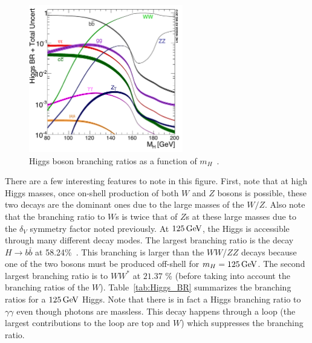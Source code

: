 \begin{figure}[h!]
  \centering
  \captionsetup{justification=centering}
  \includegraphics[width=0.6\textwidth]{figures/Higgs_BR}
  \caption{Higgs boson branching ratios as a function of $m_H$~\cite{LHCXSWG}.}
  \label{fig:branching_ratios}
\end{figure}
%
There are a few interesting features to note in this figure. First, note that at high Higgs masses, once on-shell production of both $W$ and $Z$ bosons is possible, these two decays are the dominant ones due to the large masses of the $W/Z$. Also note that the branching ratio to $W$s is twice that of $Z$s at these large masses due to the $\delta_V$ symmetry factor noted previously. At $125 \GeV$, the Higgs is accessible through many different decay modes. The largest branching ratio is the decay $H\to b\bar{b}$ at 58.24\%~\cite{LHCXSWG}. This branching is larger than the $WW$/$ZZ$ decays because one of the two bosons must be produced off-shell for $m_H = 125 \GeV$. The second largest branching ratio is to $WW^*$ at $21.37$ \% (before taking into account the branching ratios of the $W$). Table~\ref{tab:Higgs_BR} summarizes the branching ratios for a $125 \GeV$ Higgs. Note that there is in fact a Higgs branching ratio to $\gamma\gamma$ even though photons are massless. This decay happens through a loop (the largest contributions to the loop are top and $W$) which suppresses the branching ratio. 


